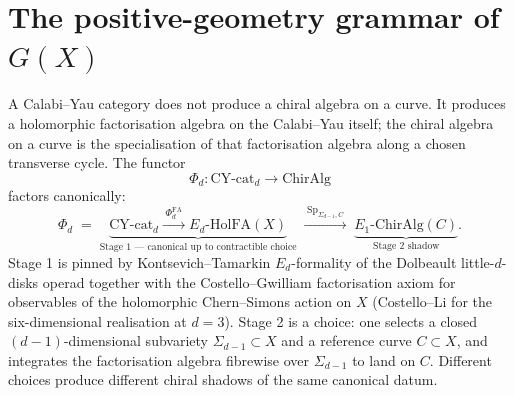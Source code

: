 
\providecommand{\ClaimStatusTheorem}{\textsc{[Theorem]}}
\providecommand{\ClaimStatusConjectured}{\textsc{[Conjectured]}}
\providecommand{\ClaimStatusDefinition}{\textsc{[Definition]}}
\providecommand{\kBKM}{\kappa_{\mathrm{BKM}}}
\providecommand{\kch}{\kappa_{\mathrm{ch}}}
\providecommand{\kcat}{\kappa_{\mathrm{cat}}}
\providecommand{\kfib}{\kappa_{\mathrm{fiber}}}
\providecommand{\CYcat}{\mathrm{CY}\text{-cat}}
\providecommand{\ChirAlg}{\mathrm{ChirAlg}}
\providecommand{\HolFA}{\mathrm{HolFA}}
\providecommand{\hCS}{\mathrm{hCS}}
\providecommand{\Sp}{\mathrm{Sp}}
\providecommand{\cF}{\mathcal{F}}
\providecommand{\cE}{\mathcal{E}}
\providecommand{\cO}{\mathcal{O}}
\providecommand{\cM}{\mathcal{M}}
\providecommand{\fg}{\mathfrak{g}}
\providecommand{\CoHA}{\mathrm{CoHA}}
\providecommand{\Meff}{\mathcal{M}^{+}_{\mathrm{eff}}}
\providecommand{\ZZ}{\mathbb{Z}}
\providecommand{\CC}{\mathbb{C}}
\providecommand{\Obs}{\mathrm{Obs}}
\providecommand{\CE}{\mathrm{CE}}
\providecommand{\chir}{\mathrm{chir}}
\providecommand{\bH}{\mathbf{H}}


\section*{The positive-geometry grammar of $G(X)$}
\label{wn:sec:platonic-preface-positive-geometry-grammar-wn}

A Calabi--Yau category does not produce a chiral algebra on a curve.
It produces a holomorphic factorisation algebra on the Calabi--Yau
itself; the chiral algebra on a curve is the specialisation of that
factorisation algebra along a chosen transverse cycle. The functor
\[
\Phi_d: \CYcat_d \longrightarrow \ChirAlg
\]
factors canonically:
\[
\Phi_d \;=\; \underbrace{\CYcat_d \xrightarrow{\;\Phi^{\mathrm{FA}}_d\;}
E_d\text{-}\HolFA(X)}_{\text{Stage 1 --- canonical up to contractible choice}}
\;\xrightarrow{\;\Sp_{\Sigma_{d-1}, C}\;}\;
\underbrace{E_1\text{-}\ChirAlg(C)}_{\text{Stage 2 shadow}}.
\]
Stage 1 is pinned by Kontsevich--Tamarkin $E_d$-formality of the
Dolbeault little-$d$-disks operad together with the Costello--Gwilliam
factorisation axiom for observables of the holomorphic Chern--Simons
action on $X$ (Costello--Li for the six-dimensional realisation at
$d = 3$). Stage 2 is a choice: one selects a closed
$(d{-}1)$-dimensional subvariety $\Sigma_{d-1} \subset X$ and a
reference curve $C \subset X$, and integrates the factorisation algebra
fibrewise over $\Sigma_{d-1}$ to land on $C$. Different choices
produce different chiral shadows of the same canonical datum.

